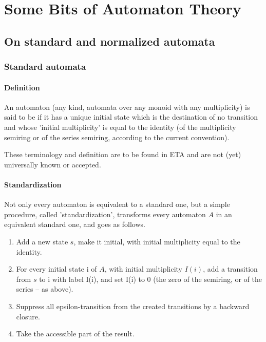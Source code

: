 \chapter{Some Bits of Automaton Theory}
\label{sec:theory}

\section{On standard and normalized automata}

\subsection{Standard automata}

\subsubsection{Definition}

\begin{definition}
  An automaton (any kind, automata over any monoid with any
  multiplicity) is said to be  if it has a unique
  initial state which is the destination of no transition and whose
  'initial multiplicity' is equal to the identity (of the multiplicity
  semiring or of the series semiring, according to the current
  convention).
\end{definition}

\begin{remark}
  These terminology and definition are to be found in ETA and are not
  (yet) universally known or accepted.
\end{remark}

\subsubsection{Standardization}

Not only every automaton is equivalent to a standard one, but a simple
procedure, called 'standardization', transforms every automaton $A$ in
an equivalent standard one, and goes as follows.

\begin{enumerate}
\item Add a new state $s$, make it initial, with initial multiplicity
  equal to the identity.

\item For every initial state i of $A$, with initial multiplicity
  $I(i)$, add a transition from $s$ to i with label I(i), and set I(i)
  to 0 (the zero of the semiring, or of the series -- as above).

\item\label{ite:suppress} Suppress all epsilon-transition from the
  created transitions by a backward closure.

\item\label{ite:take} Take the accessible part of the result.
\end{enumerate}

